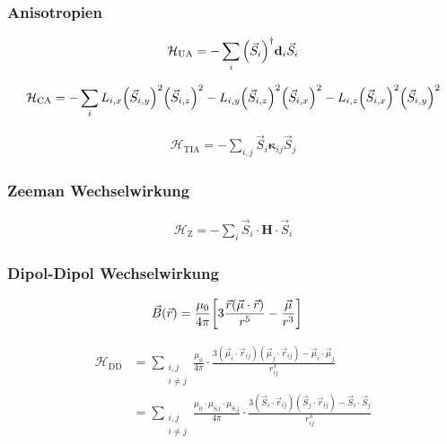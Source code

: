 \documentclass[main.tex]{subfiles}
\begin{document}
\subsubsection*{Anisotropien}
\begin{align}
	\mathcal{H}_{\text{UA}} = -\sum_{i} \qty(\vec{S}_i)^\dagger \mathbf{d}_i
	\vec{S}_i
\end{align}


\begin{align}
	\mathcal{H}_{\text{CA}} = -\sum_{i} L_{i,x} \qty(\vec{S}_{i,y})^2
	\qty(\vec{S}_{i,z})^2 - L_{i,y} \qty(\vec{S}_{i,z})^2 \qty(\vec{S}_{i,x})^2
	-
	L_{i,z} \qty(\vec{S}_{i,x})^2 \qty(\vec{S}_{i,y})^2
\end{align}


\begin{align}
	\mathcal{H}_{\text{TIA}} = -\sum_{i,j} \vec{S}_i \mathbf{\kappa}_{ij}
	\vec{S}_j
\end{align}

\subsubsection*{Zeeman Wechselwirkung}

\begin{align}
	\mathcal{H}_{\text{Z}} = -\sum_{i} \vec{S}_i \cdot \mathbf{H} \cdot
	\vec{S}_i
\end{align}

\subsubsection*{Dipol-Dipol Wechselwirkung}

\begin{align}
	\vec{B}(\vec{r}) & = \frac{\mu_0}{4\pi} \qty[3 \frac{\vec{r}(\vec{\mu}
			\cdot
			\vec{r})}{r^5} - \frac{\vec{\mu}}{r^3}]
\end{align}

\begin{align}
	\mathcal{H}_{\text{DD}} & = \sum_{\substack{i,j \\ i \neq j}}
	\frac{\mu_0}{4\pi}
	\cdot  \frac{3(\vec{\mu}_i \cdot \vec{r}_{ij})(\vec{\mu}_j \cdot
		\vec{r}_{ij})
	- \vec{\mu}_i \cdot \vec{\mu}_j}{r_{ij}^3}      \\
	                        & = \sum_{\substack{i,j \\ i \neq j}}
	\frac{\mu_0 \cdot \mu_{\text{S,i}} \cdot \mu_{\text{S,j}}}{4\pi}
	\cdot \frac{3(\vec{S}_i \cdot \vec{r}_{ij})(\vec{S}_j \cdot
		\vec{r}_{ij})
		- \vec{S}_i \cdot \vec{S}_j}{r_{ij}^3}
\end{align}
\end{document}
